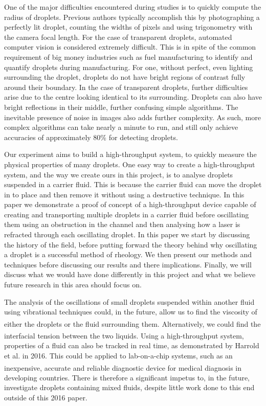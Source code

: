 \documentclass{physics_article_B}
\begin{document}
One of the major difficulties encountered during studies is to quickly compute the radius of droplets. Previous authors typically accomplish this by photographing a perfectly lit droplet, counting the widths of pixels and using trigonometry with the camera focal length. For the case of transparent droplets, automated computer vision is considered extremely difficult. This is in spite of the common requirement of big money industries such as fuel manufacturing to identify and quantify droplets during manufacturing\cite{bubblegeneral}. For one, without perfect, even lighting surrounding the droplet, droplets do not have bright regions of contrast fully around their boundary. In the case of transparent droplets, further difficulties arise due to the centre looking identical to its surrounding. Droplets can also have bright reflections in their middle, further confusing simple algorithms\cite{bubblegeneral}. The inevitable presence of noise in images also adds further complexity. As such, more complex algorithms can take nearly a minute to run, and still only achieve accuracies of approximately 80\%\cite{bubble2} for detecting droplets.

Our experiment aims to build a high-throughput system,  to quickly measure the physical properties of many droplets. One easy way to create a high-throughput system, and the way we create ours in this project, is to analyse droplets suspended in a carrier fluid. This is because the carrier fluid can move the droplet in to place and then remove it without using a destructive technique. In this paper we demonstrate a proof of concept of a high-throughput device capable of creating and transporting multiple droplets in a carrier fluid before oscillating them using an obstruction in the channel and then analysing how a laser is refracted through each oscillating droplet. In this paper we start by discussing the history of the field, before putting forward the theory behind why oscillating a droplet is a successful method of rheology. We then present our methods and techniques before discussing our results and there implications. Finally, we will discuss what we would have done differently in this project and what we believe future research in this area should focus on.

The analysis of the oscillations of small droplets suspended within another fluid using vibrational techniques could, in the future, allow us to find the viscosity of either the droplets or the fluid surrounding them\textsuperscript{\cite{Backholm2017}}. Alternatively, we could find the interfacial tension between the two liquids\textsuperscript{\cite{Backholm2017}}. Using a high-throughput system, properties of a fluid can also be tracked in real time, as demonstrated by Harrold et al. in 2016\cite{harrold}. This could be applied to lab-on-a-chip systems, such as an inexpensive, accurate and reliable diagnostic device\textsuperscript{\cite{yager}} for medical diagnosis in developing countries. There is therefore a significant impetus to, in the future, investigate droplets containing mixed fluids, despite little work done to this end outside of this 2016 paper. 
\end{document}
